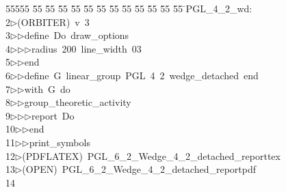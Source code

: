 %
%
\begin{tabbing}
55555 \= 55 \= 55 \= 55 \= 55 \= 55 \= 55 \= 55 \= 55 \= 55 \= 55 \= 55 \= 55 \= \>PGL\_4\_2\_wd:\\[0pt]
2\>$\triangleright$\>(ORBITER)\ v\ 3\ \\[0pt]
3\>$\triangleright$\>$\triangleright$\>define\ Do\ draw\_options\ \\[0pt]
4\>$\triangleright$\>$\triangleright$\>$\triangleright$\>radius\ 200\ line\_width\ 03\ \\[0pt]
5\>$\triangleright$\>$\triangleright$\>end\ \\[0pt]
6\>$\triangleright$\>$\triangleright$\>define\ G\ linear\_group\ PGL\ 4\ 2\ wedge\_detached\ end\ \\[0pt]
7\>$\triangleright$\>$\triangleright$\>with\ G\ do\ \\[0pt]
8\>$\triangleright$\>$\triangleright$\>group\_theoretic\_activity\ \\[0pt]
9\>$\triangleright$\>$\triangleright$\>$\triangleright$\>report\ Do\ \\[0pt]
10\>$\triangleright$\>$\triangleright$\>end\ \\[0pt]
11\>$\triangleright$\>$\triangleright$\>print\_symbols\\[0pt]
12\>$\triangleright$\>(PDFLATEX)\ PGL\_6\_2\_Wedge\_4\_2\_detached\_reporttex\\[0pt]
13\>$\triangleright$\>(OPEN)\ PGL\_6\_2\_Wedge\_4\_2\_detached\_reportpdf\\[0pt]
14\>\end{tabbing}
